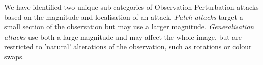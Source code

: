 \documentclass[conference,compsoc]{IEEEtran}
\begin{document}


We have identified two unique sub-categories of Observation Perturbation attacks based on the magnitude and localisation of an attack. 
\textit{Patch attacks} target a small section of the observation but may use a larger magnitude. \textit{Generalisation attacks} use both a large magnitude and may affect the whole image, but are restricted to 'natural' alterations of the observation, such as rotations or colour swaps.
\end{document}
